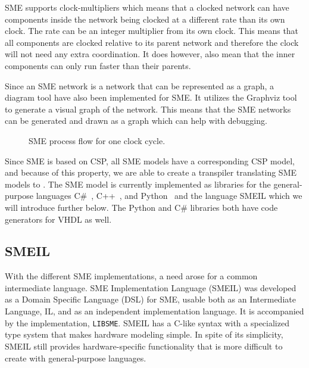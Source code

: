 SME supports clock-multipliers which means that a clocked network can have components inside the network being clocked at a different rate than its own clock. The rate can be an integer multiplier from its own clock. This means that all components are clocked relative to its parent network and therefore the clock will not need any extra coordination. It does however, also mean that the inner components can only run faster than their parents.

Since an SME network is a network that can be represented as a graph, a diagram tool have also been implemented for SME. It utilizes the Graphviz tool to generate a visual graph of the network. This means that the SME networks can be generated and drawn as a graph which can help with debugging.


\begin{figure}[!ht]
  \centering
  \caption{SME process flow for one clock cycle.}
  \label{fig:sme_process_flow}
\end{figure}
Since SME is based on CSP, all SME models have a
corresponding CSP model, and because of this property, we are able to create a transpiler translating SME models to \cspm{}.
The SME model is currently implemented as libraries for the general-purpose languages C\#~\cite{Skovhede}, C++~\cite{asheim2015}, and Python~\cite{asheim2016vhdl} and the language SMEIL which we will introduce further below. The Python and C\# libraries both have code generators for VHDL as well.
\subsection{SMEIL}
\label{SMEIL-section}
With the different SME implementations, a need arose for a common intermediate language. SME Implementation Language (SMEIL) was developed as a Domain Specific Language (DSL) for SME, usable both as an Intermediate Language, IL, and as an independent implementation language. It is accompanied by the implementation, \texttt{LIBSME}. %
SMEIL has a C-like syntax with a specialized type system that makes hardware modeling simple. In spite of its simplicity, SMEIL still provides hardware-specific functionality that is more difficult to create with general-purpose languages.

